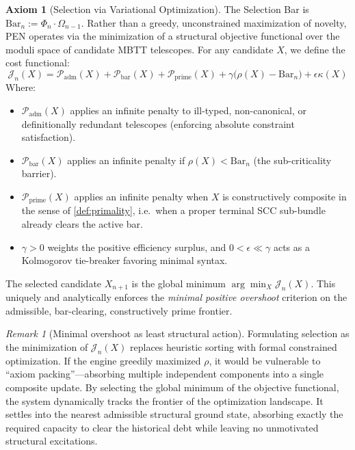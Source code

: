 \documentclass[11pt,a4paper]{article}
\theoremstyle{plain}
\theoremstyle{definition}
\newtheorem{axiom}[theorem]{Axiom}
\theoremstyle{remark}
\newtheorem{remark}[theorem]{Remark}
\begin{document}
\begin{axiom}[Selection via Variational Optimization]
\label{ax:selection}
The Selection Bar is $\mathrm{Bar}_n := \Phi_n \cdot \Omega_{n-1}$. Rather than a greedy, unconstrained maximization of novelty, PEN operates via the minimization of a structural objective functional over the moduli space of candidate MBTT telescopes. For any candidate $X$, we define the cost functional:
\begin{equation}
    \mathcal{J}_n(X) = \mathcal{P}_{\mathrm{adm}}(X) + \mathcal{P}_{\mathrm{bar}}(X) + \mathcal{P}_{\mathrm{prime}}(X) + \gamma \big( \rho(X) - \mathrm{Bar}_n \big) + \epsilon \kappa(X)
\end{equation}
Where:
\begin{itemize}[nosep]
    \item $\mathcal{P}_{\mathrm{adm}}(X)$ applies an infinite penalty to ill-typed, non-canonical, or definitionally redundant telescopes (enforcing absolute constraint satisfaction).
    \item $\mathcal{P}_{\mathrm{bar}}(X)$ applies an infinite penalty if $\rho(X) < \mathrm{Bar}_n$ (the sub-criticality barrier).
    \item $\mathcal{P}_{\mathrm{prime}}(X)$ applies an infinite penalty when $X$ is constructively composite in the sense of \cref{def:primality}, i.e.\ when a proper terminal SCC sub-bundle already clears the active bar.
    \item $\gamma > 0$ weights the positive efficiency surplus, and $0 < \epsilon \ll \gamma$ acts as a Kolmogorov tie-breaker favoring minimal syntax.
\end{itemize}
The selected candidate $X_{n+1}$ is the global minimum $\arg\min_X \mathcal{J}_n(X)$. This uniquely and analytically enforces the \emph{minimal positive overshoot} criterion on the admissible, bar-clearing, constructively prime frontier.
\end{axiom}

\begin{remark}[Minimal overshoot as least structural action]
Formulating selection as the minimization of $\mathcal{J}_n(X)$ replaces heuristic sorting with formal constrained optimization. If the engine greedily maximized $\rho$, it would be vulnerable to ``axiom packing''—absorbing multiple independent components into a single composite update. By selecting the global minimum of the objective functional, the system dynamically tracks the frontier of the optimization landscape. It settles into the nearest admissible structural ground state, absorbing exactly the required capacity to clear the historical debt while leaving no unmotivated structural excitations.
\end{remark}
\end{document}

